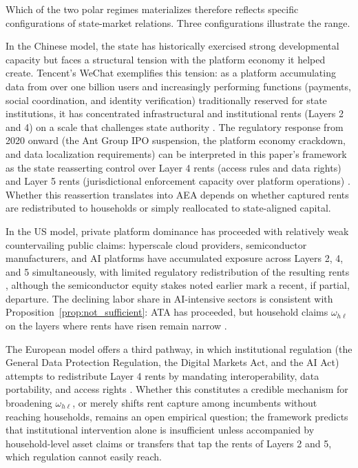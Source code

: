 \documentclass[11pt]{article}
\begin{document}
Which of the two polar regimes materializes therefore reflects specific configurations of state-market relations. Three configurations illustrate the range.

In the Chinese model, the state has historically exercised strong developmental capacity but faces a structural tension with the platform economy it helped create. Tencent's WeChat exemplifies this tension: as a platform accumulating data from over one billion users and increasingly performing functions (payments, social coordination, and identity verification) traditionally reserved for state institutions, it has concentrated infrastructural and institutional rents (Layers 2 and 4) on a scale that challenges state authority \citep{PearsonRithmireTsai2021}. The regulatory response from 2020 onward (the Ant Group IPO suspension, the platform economy crackdown, and data localization requirements) can be interpreted in this paper's framework as the state reasserting control over Layer 4 rents (access rules and data rights) and Layer 5 rents (jurisdictional enforcement capacity over platform operations) \citep{PearsonRithmireTsai2021, Gruin2019}. Whether this reassertion translates into AEA depends on whether captured rents are redistributed to households or simply reallocated to state-aligned capital.

In the US model, private platform dominance has proceeded with relatively weak countervailing public claims: hyperscale cloud providers, semiconductor manufacturers, and AI platforms have accumulated exposure across Layers 2, 4, and 5 simultaneously, with limited regulatory redistribution of the resulting rents \citep{OECD2025AIInfra}, although the semiconductor equity stakes noted earlier mark a recent, if partial, departure. The declining labor share in AI-intensive sectors is consistent with Proposition~\ref{prop:not_sufficient}: ATA has proceeded, but household claims \(\omega_{h\ell}\) on the layers where rents have risen remain narrow \citep{AcemogluRestrepo2021}.

The European model offers a third pathway, in which institutional regulation (the General Data Protection Regulation, the Digital Markets Act, and the AI Act) attempts to redistribute Layer 4 rents by mandating interoperability, data portability, and access rights \citep{EC2024AIAct}. Whether this constitutes a credible mechanism for broadening \(\omega_{h\ell}\), or merely shifts rent capture among incumbents without reaching households, remains an open empirical question; the framework predicts that institutional intervention alone is insufficient unless accompanied by household-level asset claims or transfers that tap the rents of Layers 2 and 5, which regulation cannot easily reach.
\end{document}
